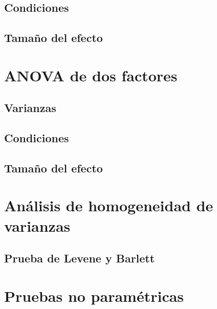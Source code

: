 \documentclass[
]{book}
\theoremstyle{definition}
\theoremstyle{definition}
\theoremstyle{definition}
\theoremstyle{definition}
\theoremstyle{remark}
\begin{document}
\hypertarget{condiciones}{%
\subsection{Condiciones}\label{condiciones}}

\hypertarget{tamauxf1o-del-efecto}{%
\subsection{Tamaño del efecto}\label{tamauxf1o-del-efecto}}

\hypertarget{anova-de-dos-factores}{%
\section{ANOVA de dos factores}\label{anova-de-dos-factores}}

\hypertarget{varianzas-1}{%
\subsection{Varianzas}\label{varianzas-1}}

\hypertarget{condiciones-1}{%
\subsection{Condiciones}\label{condiciones-1}}

\hypertarget{tamauxf1o-del-efecto-1}{%
\subsection{Tamaño del efecto}\label{tamauxf1o-del-efecto-1}}

\hypertarget{anuxe1lisis-de-homogeneidad-de-varianzas}{%
\section{Análisis de homogeneidad de varianzas}\label{anuxe1lisis-de-homogeneidad-de-varianzas}}

\hypertarget{prueba-de-levene-y-barlett}{%
\subsection{Prueba de Levene y Barlett}\label{prueba-de-levene-y-barlett}}

\hypertarget{pruebas-no-paramuxe9tricas}{%
\section{Pruebas no paramétricas}\label{pruebas-no-paramuxe9tricas}}
\end{document}
